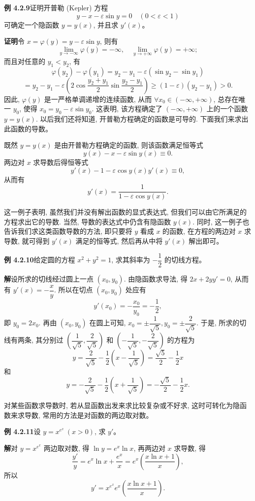 \documentclass[UTF8, 12pt, fontset=fandol, oneside]{ctexart}
\begin{document}
\noindent\textbf{例 4.2.9}\quad 证明开普勒 (Kepler) 方程
\[
  y-x-\varepsilon\sin y=0
  \quad(0<\varepsilon<1)
\]
可确定一个隐函数 $y=y(x)$, 并且求 $y'(x)$。

\noindent\textbf{证明}\quad 令 $x=\varphi(y)=y-\varepsilon\sin y$, 则有
\[
  \lim_{y\to-\infty}\varphi(y)=-\infty,
  \quad
  \lim_{y\to+\infty}\varphi(y)=+\infty;
\]
而且对任意的 $y_1<y_2$, 有
\[
  \varphi(y_2)-\varphi(y_1)
  =
  y_2-y_1-\varepsilon(\sin y_2-\sin y_1)
\]
\[
  =
  y_2-y_1-\varepsilon\left(2\cos\frac{y_2+y_1}{2}\sin\frac{y_2-y_1}{2}\right)
  \geqslant(1-\varepsilon)(y_2-y_1)>0.
\]
因此, $\varphi(y)$ 是一严格单调递增的连续函数, 从而 $\forall x_0\in(-\infty,+\infty)$, 总存在唯一 $y_0$, 使得 $x_0=y_0-\varepsilon\sin y_0$. 这表明, 该方程确定了 $(-\infty,+\infty)$ 上的一个函数 $y=y(x)$. 以后我们还将知道, 开普勒方程确定的函数是可导的. 下面我们来求出此函数的导数。

既然 $y=y(x)$ 是由开普勒方程确定的函数, 则该函数满足恒等式
\[
  y(x)-x-\varepsilon\sin y(x)\equiv0.
\]
两边对 $x$ 求导数后得恒等式
\[
  y'(x)-1-\varepsilon\cos y(x)y'(x)\equiv0,
\]
从而有
\[
  y'(x)=\frac1{1-\varepsilon\cos y(x)}.
\]

这一例子表明, 虽然我们并没有解出函数的显式表达式, 但我们可以由它所满足的方程求出它的导数. 当然, 导数的表达式中仍含有隐函数 $y(x)$. 同时, 这一例子也告诉我们求这类函数导数的方法, 即只要将 $y$ 看成 $x$ 的函数, 在方程的两边对 $x$ 求导数, 就可得到 $y'(x)$ 满足的恒等式, 然后再从中将 $y'(x)$ 解出即可。

\noindent\textbf{例 4.2.10}\quad 给定圆的方程 $x^2+y^2=1$, 求其斜率为 $-\dfrac12$ 的切线方程。

\noindent\textbf{解}\quad 设所求的切线经过圆上一点 $(x_0,y_0)$. 由隐函数求导法, 得 $2x+2yy'=0$, 从而有 $y'(x)=-\dfrac{x}{y}$. 所以在切点 $(x_0,y_0)$ 处应有
\[
  y'(x_0)=-\frac{x_0}{y_0}=-\frac12,
\]
即 $y_0=2x_0$. 再由 $(x_0,y_0)$ 在圆上可知, $x_0=\pm\dfrac1{\sqrt5},y_0=\pm\dfrac2{\sqrt5}$. 于是, 所求的切线有两条, 其分别过 $\left(\dfrac1{\sqrt5},\dfrac2{\sqrt5}\right)$ 和 $\left(-\dfrac1{\sqrt5},-\dfrac2{\sqrt5}\right)$ 的方程为
\[
  y=\frac2{\sqrt5}-\frac12\left(x-\frac1{\sqrt5}\right)
  =
  \frac{\sqrt5}2-\frac12x
\]
和
\[
  y=-\frac2{\sqrt5}-\frac12\left(x+\frac1{\sqrt5}\right)
  =
  -\frac{\sqrt5}2-\frac12x.
\]

对某些函数求导数时, 若从显函数出发来求比较复杂或不好求, 这时可转化为隐函数来求导数, 常用的方法是对函数的两边取对数。

\noindent\textbf{例 4.2.11}\quad 设 $y=x^{e^x}\ (x>0)$, 求 $y'$。

\noindent\textbf{解}\quad 对 $y=x^{e^x}$ 两边取对数, 得 $\ln y=e^x\ln x$, 再两边对 $x$ 求导数, 得
\[
  \frac{y'}y=e^x\ln x+\frac{e^x}x
  =
  e^x\left(\frac{x\ln x+1}{x}\right),
\]
所以
\[
  y'=x^{e^x}e^x\left(\frac{x\ln x+1}{x}\right).
\]
\end{document}
